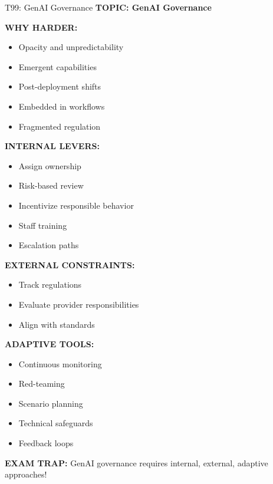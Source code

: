 \documentclass[8pt]{beamer}
\begin{document}
	\begin{frame}{T99: GenAI Governance}
		\fontsize{6.5}{7.5}\selectfont
		\textbf{TOPIC: GenAI Governance}
		
		\vspace{0.1cm}
		\textbf{WHY HARDER:}
		\begin{itemize}
			\item Opacity and unpredictability
			\item Emergent capabilities
			\item Post-deployment shifts
			\item Embedded in workflows
			\item Fragmented regulation
		\end{itemize}
		
		\vspace{0.1cm}
		\textbf{INTERNAL LEVERS:}
		\begin{itemize}
			\item Assign ownership
			\item Risk-based review
			\item Incentivize responsible behavior
			\item Staff training
			\item Escalation paths
		\end{itemize}
		
		\vspace{0.1cm}
		\textbf{EXTERNAL CONSTRAINTS:}
		\begin{itemize}
			\item Track regulations
			\item Evaluate provider responsibilities
			\item Align with standards
		\end{itemize}
		
		\vspace{0.1cm}
		\textbf{ADAPTIVE TOOLS:}
		\begin{itemize}
			\item Continuous monitoring
			\item Red-teaming
			\item Scenario planning
			\item Technical safeguards
			\item Feedback loops
		\end{itemize}
		
		\textcolor{myred}{\textbf{EXAM TRAP:}} GenAI governance requires \textcolor{myblue}{internal, external, adaptive approaches}!
	\end{frame}
	
\end{document}
